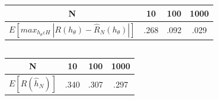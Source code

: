 \documentclass[]{article}
\begin{document}
\subsection{}
\begin{tabular}{|c | c | c | c|}
	\hline
	N & 10 & 100 & 1000\\
	\hline
	$E[max_{h_\theta \varepsilon H} \: |R(h_\theta) - \hat{R}_N(h_\theta)|]$& .268 & .092 & .029\\
	\hline
\end{tabular}
\subsection{}
\begin{tabular}{|c | c | c | c|}
	\hline
	N & 10 & 100 & 1000\\
	\hline
	$E[R(\hat{h}_N)]$& .340 & .307 & .297\\
	\hline
\end{tabular}
\end{document}
